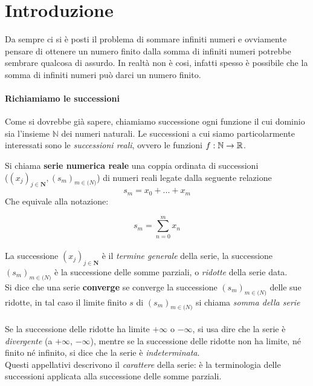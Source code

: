 \documentclass[12pt, a4paper, openany]{book}
\newcommand{\definizione}[1]{\begin{box_definizione} #1 \end{box_definizione}}
\begin{document}
\section{Introduzione}
Da sempre ci si è posti il problema di sommare infiniti numeri e ovviamente pensare di ottenere un numero finito dalla somma di infiniti numeri potrebbe sembrare qualcosa di assurdo.
In realtà non è cosi, infatti spesso è possibile che la somma di infiniti numeri può darci un numero finito.

\paragraph*{Richiamiamo le successioni}
Come si dovrebbe già sapere, chiamiamo successione ogni funzione il cui dominio sia l'insieme $\mathbb{N}$ dei numeri naturali.
Le successioni a cui siamo particolarmente interessati sono le \emph{successioni reali}, ovvero le funzioni $f : \mathbb{N} \rightarrow \mathbb{R}$.
\definizione{
Si chiama \textbf{serie numerica reale} una coppia ordinata di successioni \\
($(x_j)_{j\in \mathbf{N}}, (s_m)_{m\in \mathbf(N)}$) di numeri reali legate dalla seguente relazione
\begin{equation*}
    s_m = x_0 + ... + x_m
\end{equation*}
Che equivale alla notazione:

\begin{equation*}
    s_m = \sum_{n=0}^m x_n
\end{equation*}
}
\paragraph*{}La successione $(x_j)_{j\in \mathbf{N}}$ è il \emph{termine generale} della serie, la successione $(s_m)_{m\in \mathbf(N)}$ è la successione delle somme parziali, o \emph{ridotte} della serie data.\\
Si dice che una serie \textbf{converge} se converge la successione $(s_m)_{m\in \mathbf(N)}$ delle sue ridotte, in tal caso il limite finito $s$ di $(s_m)_{m\in \mathbf(N)}$ si chiama \emph{somma della serie}
\paragraph*{}Se la successione delle ridotte ha limite $+ \infty$ o $- \infty$, si usa dire che la serie è \emph{divergente} (a $+ \infty$, $- \infty$), mentre se la successione delle ridotte non ha limite, né finito né infinito, si dice che la serie è \emph{indeterminata}.
\\Questi appellativi descrivono il \emph{carattere} della serie: è  la terminologia delle successioni applicata alla successione delle somme parziali. 
\end{document}
